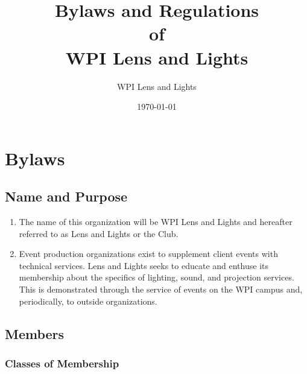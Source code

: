 \documentclass[12pt,letterpaper]{book}
\title{Bylaws and Regulations \\ of \\ WPI Lens and Lights}
\author{WPI Lens and Lights}
\date{\today}
\begin{document}
\maketitle

\tableofcontents
\newpage

\part{Bylaws}

\renewcommand{\chaptername}{Article}

\chapter{Name and Purpose}

\begin{enumerate}

\item The name of this organization will be WPI Lens and Lights and hereafter referred to as Lens and Lights or the Club.
\item Event production organizations exist to supplement client events with technical services. Lens and Lights seeks to educate and enthuse its membership about the specifics of lighting, sound, and projection services. This is demonstrated through the service of events on the WPI campus and, periodically, to outside organizations.

\end{enumerate}

\chapter{Members}

\section{Classes of Membership} \label{sec:classesofmembership}
\end{document}
